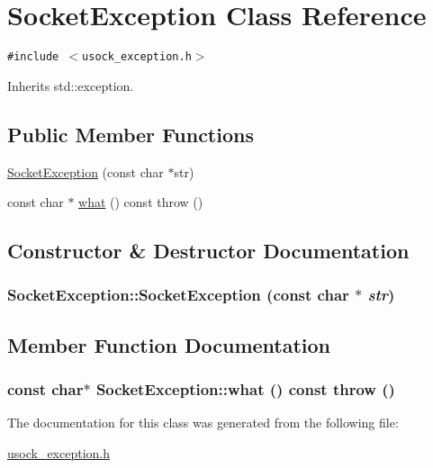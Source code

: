 \hypertarget{classSocketException}{
\section{SocketException Class Reference}
\label{classSocketException}
}
{\tt \#include $<$usock\_\-exception.h$>$}

Inherits std::exception.

\subsection*{Public Member Functions}
\begin{CompactItemize}
\item 
\hyperlink{classSocketException_f439f2ef10e06643b4a40f4fbda853c1}{SocketException} (const char $\ast$str)
\item 
const char $\ast$ \hyperlink{classSocketException_ba95967e3d7a0496d831d9608f6ead97}{what} () const   throw ()
\end{CompactItemize}


\subsection{Constructor \& Destructor Documentation}
\hypertarget{classSocketException_f439f2ef10e06643b4a40f4fbda853c1}{
\subsubsection[{SocketException}]{\setlength{\rightskip}{0pt plus 5cm}SocketException::SocketException (const char $\ast$ {\em str})}}
\label{classSocketException_f439f2ef10e06643b4a40f4fbda853c1}




\subsection{Member Function Documentation}
\hypertarget{classSocketException_ba95967e3d7a0496d831d9608f6ead97}{
\subsubsection[{what}]{\setlength{\rightskip}{0pt plus 5cm}const char$\ast$ SocketException::what () const  throw ()}}
\label{classSocketException_ba95967e3d7a0496d831d9608f6ead97}




The documentation for this class was generated from the following file:\begin{CompactItemize}
\item 
\hyperlink{usock__exception_8h}{usock\_\-exception.h}\end{CompactItemize}
